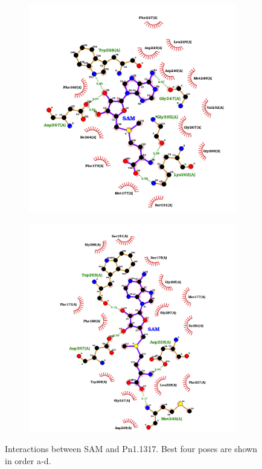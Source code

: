 \documentclass[12pt]{article}
\begin{document}
\begin{figure}[h!]
\begin{subfigure}[h!]{0.35\textwidth}
			\caption{}
		\end{subfigure}
		\hfill
		\begin{subfigure}[h!]{0.35\textwidth}
			\hspace{2cm}
			\includegraphics[width=\textwidth]{../4/Dock/best3.png}
			\caption{}
		\end{subfigure}
		\hfill
		\begin{subfigure}[h!]{0.35\textwidth}
			\hspace{-2cm}
			\includegraphics[width=\textwidth]{../4/Dock/best4.png}
			\caption{}
		\end{subfigure}
		\hfill
		\caption[Interactions between SAM and Pn1.1317.]{Interactions between SAM and Pn1.1317. Best four poses are shown in order a-d.}
		\label{fig4_7}
	\end{figure}
	\FloatBarrier
	
\end{document}
